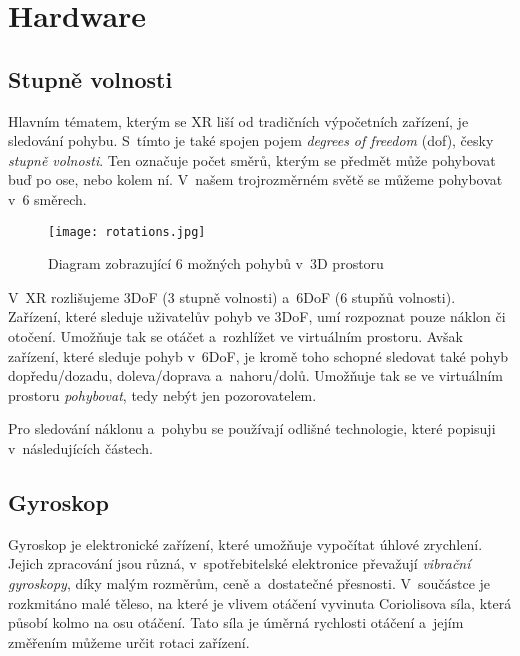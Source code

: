 \chapter{Hardware}

\section{Stupně volnosti}

Hlavním tématem, kterým se XR liší od tradičních výpočetních zařízení, je sledování pohybu. S~tímto je také spojen pojem \textit{degrees of freedom} (\gls{dof}), česky \textit{stupně volnosti}. Ten označuje počet směrů, kterým se předmět může pohybovat \poml buď po ose, nebo kolem ní. V~našem trojrozměrném světě se můžeme pohybovat v~6 směrech. \cite{mechatech_3dof_6dof}

\begin{figure}[H]
    \centering
    \texttt{[image: rotations.jpg]}
    \caption{Diagram zobrazující 6 možných pohybů v~3D prostoru \cite{nasa_aircraft}}
    \label{rotations_nasa_fig}
\end{figure}

V~XR rozlišujeme 3DoF (3 stupně volnosti) a~6DoF (6 stupňů volnosti). Zařízení, které sleduje uživatelův pohyb ve 3DoF, umí rozpoznat pouze náklon či otočení. Umožňuje tak se otáčet a~rozhlížet ve virtuálním prostoru. Avšak zařízení, které sleduje pohyb v~6DoF, je kromě toho schopné sledovat také pohyb dopředu/dozadu, doleva/doprava a~nahoru/dolů. Umožňuje tak se ve virtuálním prostoru \textit{pohybovat}, tedy nebýt jen pozorovatelem. \cite{mechatech_3dof_6dof}

Pro sledování náklonu a~pohybu se používají odlišné technologie, které popisuji v~následujících částech.

\section{Gyroskop}

Gyroskop je elektronické zařízení, které umožňuje vypočítat úhlové zrychlení. Jejich zpracování jsou různá, v~spotřebitelské elektronice převažují \textit{vibrační gyroskopy}, díky malým rozměrům, ceně a~dostatečné přesnosti. V~součástce je rozkmitáno malé těleso, na které je vlivem otáčení vyvinuta Coriolisova síla, která působí kolmo na osu otáčení. Tato síla je úměrná rychlosti otáčení a~jejím změřením můžeme určit rotaci zařízení. \cite{Electricity_Magnetism} \cite{techmania_coriolis}


